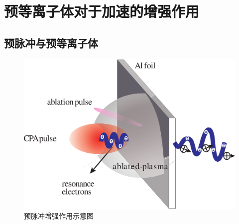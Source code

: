 
\chapter{预等离子体对于加速的增强作用}
\label{chap:preplasmaEhancement}

\section{}



\section{预脉冲与预等离子体}
\begin{figure}[!htbp]
  \centering
  \includegraphics[width=\MyFactor\textwidth]{Img/enhancement.eps}
  \caption{预脉冲增强作用示意图}
  \label{fig:prepulse2012}
\end{figure}



